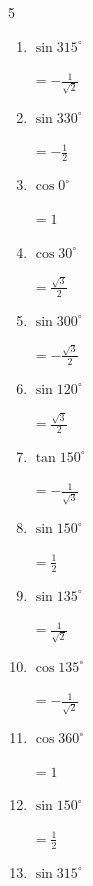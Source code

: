 \begin{multicols}{5}
\begin{enumerate}
        $\displaystyle =0$

  \item $\displaystyle \sin{315^\circ}$

        $\displaystyle =-\frac{1}{\sqrt{2}}$

  \item $\displaystyle \sin{330^\circ}$

        $\displaystyle =-\frac{1}{2}$

  \item $\displaystyle \cos{0^\circ}$

        $\displaystyle =1$

  \item $\displaystyle \cos{30^\circ}$

        $\displaystyle =\frac{\sqrt{3}}{2}$

  \item $\displaystyle \sin{300^\circ}$

        $\displaystyle =-\frac{\sqrt{3}}{2}$

  \item $\displaystyle \sin{120^\circ}$

        $\displaystyle =\frac{\sqrt{3}}{2}$

  \item $\displaystyle \tan{150^\circ}$

        $\displaystyle =-\frac{1}{\sqrt{3}}$

  \item $\displaystyle \sin{150^\circ}$

        $\displaystyle =\frac{1}{2}$

  \item $\displaystyle \sin{135^\circ}$

        $\displaystyle =\frac{1}{\sqrt{2}}$

  \item $\displaystyle \cos{135^\circ}$

        $\displaystyle =-\frac{1}{\sqrt{2}}$

  \item $\displaystyle \cos{360^\circ}$

        $\displaystyle =1$

  \item $\displaystyle \sin{150^\circ}$

        $\displaystyle =\frac{1}{2}$

  \item $\displaystyle \sin{315^\circ}$


\end{enumerate}
\end{multicols}
